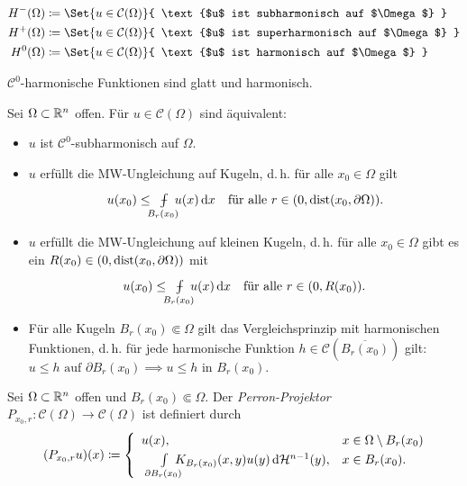 \documentclass{cheat-sheet}
\newcommand{\HM}{\mathcal{H}} %
\DeclareMathOperator{\dist}{dist} %
\def\Xint#1{\mathchoice
   {\XXint\displaystyle\textstyle{#1}}%
   {\XXint\textstyle\scriptstyle{#1}}%
   {\XXint\scriptstyle\scriptscriptstyle{#1}}%
   {\XXint\scriptscriptstyle\scriptscriptstyle{#1}}%
   \!\int}
\def\XXint#1#2#3{{\setbox0=\hbox{$#1{#2#3}{\int}$}
     \vcenter{\hbox{$#2#3$}}\kern-.5\wd0}}
\def\dashint{\Xint-}
\newcommand{\mymvint}[2]{{\textstyle \dashint\limits_{#1}^{#2}}}
\newcommand{\MVInt}[4]{\mymvint{#1}{#2} #3 \,\d #4}
\begin{document}
\begin{nota}
  \begin{minipage}[t]{0.8 \linewidth}
    \vspace{-15pt}
    \begin{align*}
      H^-(\Omega) &\coloneqq \Set{u \in \mathcal{C}(\Omega)}{ \text{$u$ ist subharmonisch auf $\Omega$} }\\
      H^+(\Omega) &\coloneqq \Set{u \in \mathcal{C}(\Omega)}{ \text{$u$ ist superharmonisch auf $\Omega$} }\\
      H^0(\Omega) &\coloneqq \Set{u \in \mathcal{C}(\Omega)}{ \text{$u$ ist harmonisch auf $\Omega$} }
    \end{align*}
  \end{minipage}
\end{nota}

\begin{bem}
  $\mathcal{C}^0$-harmonische Funktionen sind glatt und harmonisch.
\end{bem}

\begin{lem}
  Sei $\Omega \subset \mathbb{R}^n$ offen. Für $u \in \mathcal{C}(\Omega)$ sind äquivalent:
  \begin{itemize}
    \item $u$ ist $\mathcal{C}^0$-subharmonisch auf $\Omega$.
    \item $u$ erfüllt die MW-Ungleichung auf Kugeln, d.\,h. für alle $x_0 \in \Omega$ gilt
    \[
      u(x_0) \leq \enspace\MVInt{\mathclap{B_r(x_0)}}{}{\enspace u(x)}{x} \quad
      \text{für alle $r \in \ointerval{0}{\dist(x_0, \partial \Omega)}$.}
    \]
    \item $u$ erfüllt die MW-Ungleichung auf kleinen Kugeln, d.\,h. für alle $x_0 \in \Omega$ gibt es ein $R(x_0) \in \ointerval{0}{\dist(x_0, \partial \Omega)}$ mit
    \[
      u(x_0) \leq \enspace\MVInt{\mathclap{B_r(x_0)}}{}{\enspace u(x)}{x} \quad
      \text{für alle $r \in \ointerval{0}{R(x_0)}$.}
    \]
    \item Für alle Kugeln $B_r(x_0) \Subset \Omega$ gilt das Vergleichsprinzip mit harmonischen Funktionen, d.\,h. für jede harmonische Funktion $h \in \mathcal{C}(\overline{B_r(x_0)})$ gilt: $u \leq h \text{ auf $\partial B_r(x_0)$} \implies u \leq h \text{ in $B_r(x_0)$.}$
  \end{itemize}
\end{lem}

\begin{defn}
  Sei $\Omega \subset \mathbb{R}^n$ offen und $B_r(x_0) \Subset \Omega$. Der \emph{Perron-Projektor} $P_{x_0,r} : \mathcal{C}(\Omega) \to \mathcal{C}(\Omega)$ ist definiert durch
  \[
    (P_{x_0,r} u)(x) \coloneqq \begin{cases}
      \enspace u(x), & x \in \Omega \setminus B_r(x_0)\\
      \qquad \Int{\mathclap{\partial B_r(x_0)}}{}{\enspace K_{B_r(x_0)}(x,y) u(y)}{\HM^{n-1}(y)}, & x \in B_r(x_0).
    \end{cases}
  \]
\end{defn}
\end{document}
